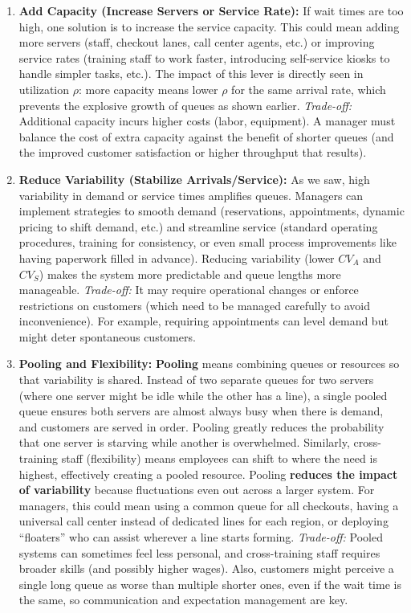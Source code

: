 \documentclass[
  letterpaper,
  DIV=11,
  numbers=noendperiod]{scrartcl}
\begin{document}
\begin{enumerate}
\def\labelenumi{\arabic{enumi}.}
\item
  \textbf{Add Capacity (Increase Servers or Service Rate):} If wait
  times are too high, one solution is to increase the service capacity.
  This could mean adding more servers (staff, checkout lanes, call
  center agents, etc.) or improving service rates (training staff to
  work faster, introducing self-service kiosks to handle simpler tasks,
  etc.). The impact of this lever is directly seen in utilization
  \(\rho\): more capacity means lower \(\rho\) for the same arrival
  rate, which prevents the explosive growth of queues as shown earlier.
  \emph{Trade-off:} Additional capacity incurs higher costs (labor,
  equipment). A manager must balance the cost of extra capacity against
  the benefit of shorter queues (and the improved customer satisfaction
  or higher throughput that results).
\item
  \textbf{Reduce Variability (Stabilize Arrivals/Service):} As we saw,
  high variability in demand or service times amplifies queues. Managers
  can implement strategies to smooth demand (reservations, appointments,
  dynamic pricing to shift demand, etc.) and streamline service
  (standard operating procedures, training for consistency, or even
  small process improvements like having paperwork filled in advance).
  Reducing variability (lower \(CV_A\) and \(CV_S\)) makes the system
  more predictable and queue lengths more manageable. \emph{Trade-off:}
  It may require operational changes or enforce restrictions on
  customers (which need to be managed carefully to avoid inconvenience).
  For example, requiring appointments can level demand but might deter
  spontaneous customers.
\item
  \textbf{Pooling and Flexibility:} \textbf{Pooling} means combining
  queues or resources so that variability is shared. Instead of two
  separate queues for two servers (where one server might be idle while
  the other has a line), a single pooled queue ensures both servers are
  almost always busy when there is demand, and customers are served in
  order. Pooling greatly reduces the probability that one server is
  starving while another is overwhelmed. Similarly, cross-training staff
  (flexibility) means employees can shift to where the need is highest,
  effectively creating a pooled resource. Pooling \textbf{reduces the
  impact of variability} because fluctuations even out across a larger
  system. For managers, this could mean using a common queue for all
  checkouts, having a universal call center instead of dedicated lines
  for each region, or deploying ``floaters'' who can assist wherever a
  line starts forming. \emph{Trade-off:} Pooled systems can sometimes
  feel less personal, and cross-training staff requires broader skills
  (and possibly higher wages). Also, customers might perceive a single
  long queue as worse than multiple shorter ones, even if the wait time
  is the same, so communication and expectation management are key.
\end{enumerate}
\end{document}
